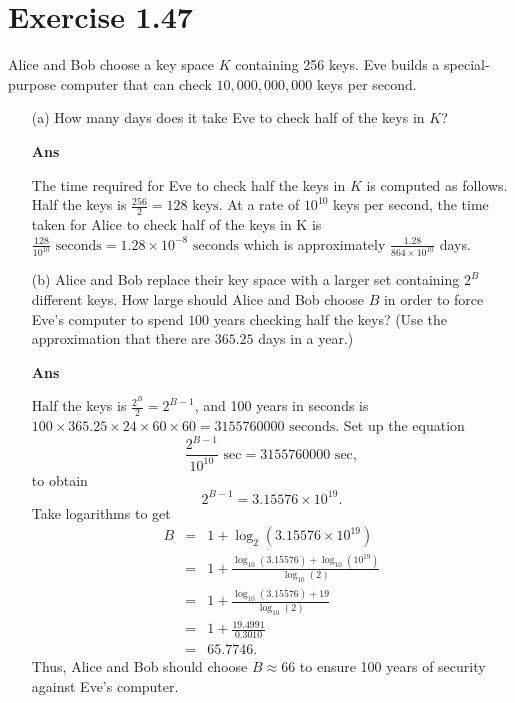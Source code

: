\documentclass[12pt]{ut-thesis}
\theoremstyle{definition}
\begin{document}
    
    


    \section*{Exercise 1.47}
        Alice and Bob choose a key space $K$ containing 256 keys. Eve builds a special-purpose 
        computer that can check $10,000,000,000$ keys per second.

        \begin{itemize}
            \item[(a)] How many days does it take Eve to check half of the keys in $K$?
            
            \textbf{Ans}

            The time required for Eve to check half the keys in $K$ is computed as follows.
            Half the keys is $\frac{256}{2} = 128 \text{ keys}.$ At a rate of $10^{10}$ keys per second, the time taken for Alice 
            to check half of the keys in K is $\frac{128}{10^{10}} \text{ seconds} = 1.28 \times 10^{-8} \text{ seconds}$ which 
            is approximately $\frac{1.28}{864\times 10^{10}}$ days.


           

            \item[(b)] Alice and Bob replace their key space with a larger set containing $2^B$ different keys. 
            How large should Alice and Bob choose $B$ in order to force Eve's computer to spend $100$ years 
            checking half the keys? (Use the approximation that there are $365.25$ days in a year.)

            \textbf{Ans}

            Half the keys is $\frac{2^B}{2} = 2^{B-1}$, and 100 years in seconds is 
            $100 \times 365.25 \times 24 \times 60 \times 60 =3155760000 \text{ seconds}$. Set up the equation
            $$\frac{2^{B-1}}{10^{10}} \text{ sec} = 3155760000 \text{ sec},$$ to obtain 
            $$2^{B-1}= 3.15576\times 10^{19}.$$
            Take logarithms to get
            \begin{eqnarray*}
                B &=& 1 + \log_2(3.15576\times 10^{19})\\
                 &=& 1 + \frac{\log_{10}(3.15576) + \log_{10}(10^{19})}{\log_{10}(2)}\\
                 &=& 1 + \frac{\log_{10}(3.15576) + 19}{\log_{10}(2)}\\
                 &=& 1 + \frac{19.4991}{0.3010}\\
                 &=& 65.7746.
            \end{eqnarray*}
            Thus, Alice and Bob should choose $B \approx 66$ to ensure 100 years of security against Eve's computer.


        \end{itemize}  
        
        
\end{document}
